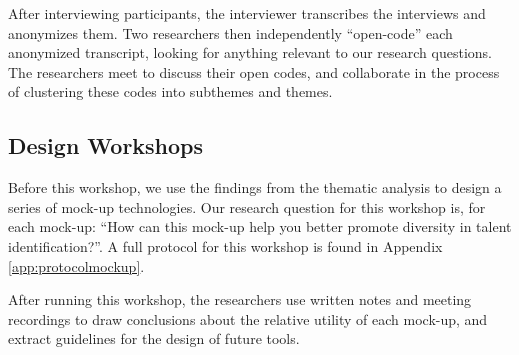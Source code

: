 After interviewing participants, the interviewer transcribes the interviews and anonymizes them. Two researchers then independently ``open-code'' each anonymized transcript, looking for anything relevant to our research questions. The researchers meet to discuss their open codes, and collaborate in the process of clustering these codes into subthemes and themes.

\subsection{Design Workshops}
Before this workshop, we use the findings from the thematic analysis to design a series of mock-up technologies. Our research question for this workshop is, for each mock-up: ``How can this mock-up help you better promote diversity in talent identification?''. A full protocol for this workshop is found in Appendix \ref{app:protocolmockup}.

After running this workshop, the researchers use written notes and meeting recordings to draw conclusions about the relative utility of each mock-up, and extract guidelines for the design of future tools.

